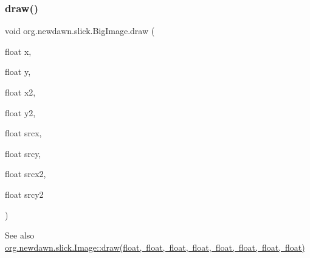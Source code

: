 \mbox{\label{classorg_1_1newdawn_1_1slick_1_1_big_image_a6e6dcf9c205a3723757bdb162723842c}} 
\subsubsection{\texorpdfstring{draw()}{draw()}\hspace{0.1cm}{\footnotesize\ttfamily [5/10]}}
{\footnotesize\ttfamily void org.\+newdawn.\+slick.\+Big\+Image.\+draw (\begin{DoxyParamCaption}\item[{float}]{x,  }\item[{float}]{y,  }\item[{float}]{x2,  }\item[{float}]{y2,  }\item[{float}]{srcx,  }\item[{float}]{srcy,  }\item[{float}]{srcx2,  }\item[{float}]{srcy2 }\end{DoxyParamCaption})\hspace{0.3cm}{\ttfamily [inline]}}

\begin{DoxySeeAlso}{See also}
\mbox{\hyperlink{classorg_1_1newdawn_1_1slick_1_1_image_aa2932e4776eaa946aa604d8eb74a87d3}{org.\+newdawn.\+slick.\+Image\+::draw(float, float, float, float, float, float, float, float)}} 
\end{DoxySeeAlso}

